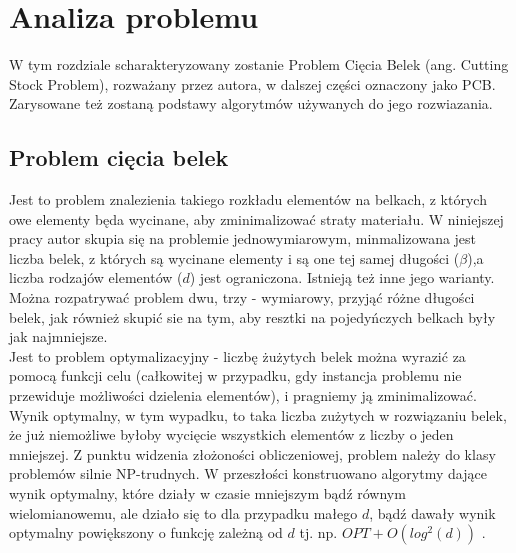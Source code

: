 \chapter{Analiza problemu}
\thispagestyle{chapterBeginStyle}

W tym rozdziale scharakteryzowany zostanie Problem Cięcia Belek (ang. Cutting Stock Problem), rozważany przez autora, w dalszej części oznaczony jako PCB.
Zarysowane też zostaną podstawy algorytmów używanych do jego rozwiazania.

\section{Problem cięcia belek}
Jest to problem znalezienia takiego rozkładu elementów na belkach, z których owe elementy będa wycinane, aby zminimalizować straty materiału.  W niniejszej pracy autor skupia się na problemie jednowymiarowym, minmalizowana jest liczba belek, z których są wycinane elementy i są one tej samej długości ($\beta$),a liczba rodzajów elementów ($d$) jest ograniczona. Istnieją też inne jego warianty. Można rozpatrywać problem dwu, trzy - wymiarowy, przyjąć różne długości belek, jak również skupić sie na tym, aby resztki na pojedyńczych belkach były jak najmniejsze.\\
Jest to problem optymalizacyjny - liczbę żużytych belek można wyrazić za pomocą funkcji celu (całkowitej w przypadku, gdy instancja problemu nie przewiduje możliwości dzielenia elementów), i pragniemy ją zminimalizować.
Wynik optymalny, w tym wypadku, to taka liczba zużytych w rozwiązaniu belek, że już niemożliwe byłoby wycięcie wszystkich elementów z liczby o jeden mniejszej.
Z punktu widzenia złożoności obliczeniowej, problem należy do klasy problemów silnie NP-trudnych. W przeszłości konstruowano algorytmy dające wynik optymalny, które działy w czasie mniejszym bądź równym wielomianowemu, ale działo się to dla przypadku małego $d$, bądź dawały wynik optymalny powiększony o funkcję zależną od $d$ tj. np. $OPT + O(log^2(d))$  \cite{ALG_OPT_1}.

